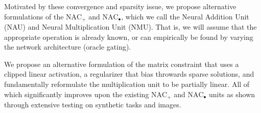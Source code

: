 Motivated by these convergence and sparsity issue, we propose alternative formulations of the $\text{NAC}_{+}$ and $\text{NAC}_{\bullet}$, which we call the Neural Addition Unit (NAU) and Neural Multiplication Unit (NMU).
That is, we will assume that the appropriate operation is already known, or can empirically be found by varying the network architecture (oracle gating). 

We propose an alternative formulation of the matrix constraint that uses a clipped linear activation, a regularizer that bias throwards sparse solutions, and fundamentally reformulate the multiplication unit to be partially linear. All of which significantly improves upon the existing $\text{NAC}_{+}$ and $\text{NAC}_{\bullet}$ units as shown through extensive testing on synthetic tasks and images.









